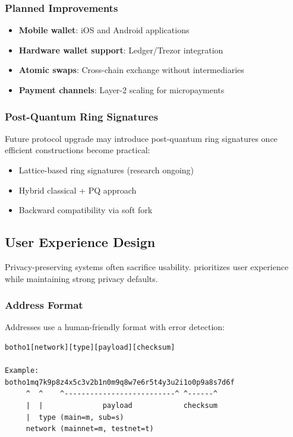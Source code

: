 \subsubsection{Planned Improvements}

\begin{itemize}
  \item \textbf{Mobile wallet}: iOS and Android applications
  \item \textbf{Hardware wallet support}: Ledger/Trezor integration
  \item \textbf{Atomic swaps}: Cross-chain exchange without intermediaries
  \item \textbf{Payment channels}: Layer-2 scaling for micropayments
\end{itemize}

\subsubsection{Post-Quantum Ring Signatures}

Future protocol upgrade may introduce post-quantum ring signatures once
efficient constructions become practical:

\begin{itemize}
  \item Lattice-based ring signatures (research ongoing)
  \item Hybrid classical + PQ approach
  \item Backward compatibility via soft fork
\end{itemize}

\subsection{User Experience Design}
\label{sec:ux}

Privacy-preserving systems often sacrifice usability. \Botho prioritizes
user experience while maintaining strong privacy defaults.

\subsubsection{Address Format}

Addresses use a human-friendly format with error detection:

\begin{lstlisting}[caption={Address format}]
botho1[network][type][payload][checksum]

Example:
botho1mq7k9p8z4x5c3v2b1n0m9q8w7e6r5t4y3u2i1o0p9a8s7d6f
     ^  ^    ^--------------------------^ ^------^
     |  |              payload            checksum
     |  type (main=m, sub=s)
     network (mainnet=m, testnet=t)
\end{lstlisting}

